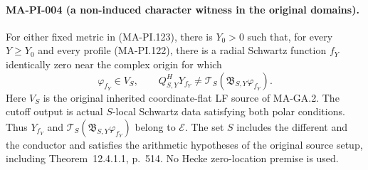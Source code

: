 \paragraph{MA-PI-004 (a non-induced character witness in the original domains).}
For either fixed metric in (MA-PI.123), there is $Y_0>0$
such that, for every $Y\ge Y_0$ and every profile
(MA-PI.122), there is a radial Schwartz function $f_Y$
identically zero near the complex origin for which
\[
 \varphi_{f_Y}\in V_S,\qquad
 Q^H_{S,Y}Y_{f_Y}
       \ne\mathcal T_S(\mathfrak B_{S,Y}\varphi_{f_Y}).
 \tag{MA-PI.124}
\]
Here $V_S$ is the original inherited coordinate-flat LF
source of MA-GA.2.  The cutoff output is actual
$S$-local Schwartz data satisfying both polar conditions.
Thus $Y_{f_Y}$ and
$\mathcal T_S(\mathfrak B_{S,Y}\varphi_{f_Y})$
belong to $\mathcal E$.
The set $S$ includes the different and the conductor and
satisfies the arithmetic hypotheses of the original
source setup, including Theorem~12.4.1.1, p.~514.
No Hecke zero-location premise is used.

